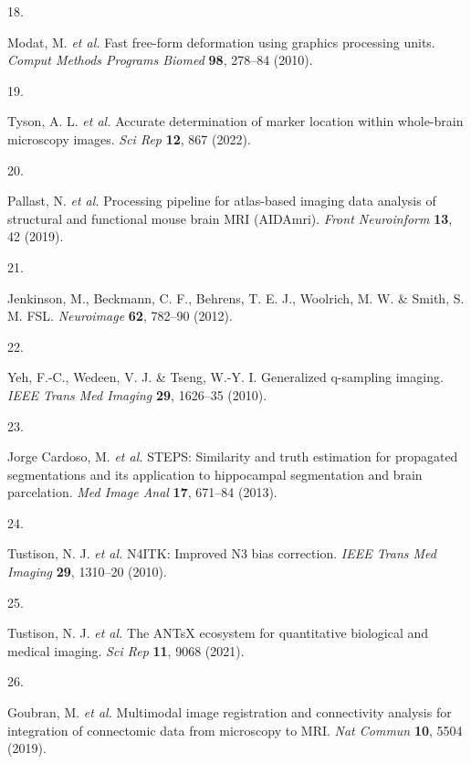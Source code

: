 \documentclass[
  12pt,
]{article}
\newlength{\cslhangindent}
\newlength{\csllabelwidth}
\newenvironment{CSLReferences}[2] %
 {%
  \setlength{\parindent}{0pt}
  \ifodd #1 \everypar{\setlength{\hangindent}{\cslhangindent}}\ignorespaces\fi
  \ifnum #2 > 0
  \setlength{\parskip}{#2\baselineskip}
  \fi
 }%
 {}
\newcommand{\CSLLeftMargin}[1]{\parbox[t]{\csllabelwidth}{#1}}
\newcommand{\CSLRightInline}[1]{\parbox[t]{\linewidth - \csllabelwidth}{#1}\break}
\begin{document}
\begin{CSLReferences}{0}{0}
\leavevmode{}%
\CSLLeftMargin{18. }
\CSLRightInline{Modat, M. \emph{et al.} Fast free-form deformation using
graphics processing units. \emph{Comput Methods Programs Biomed}
\textbf{98}, 278--84 (2010).}

\leavevmode{}%
\CSLLeftMargin{19. }
\CSLRightInline{Tyson, A. L. \emph{et al.} Accurate determination of
marker location within whole-brain microscopy images. \emph{Sci Rep}
\textbf{12}, 867 (2022).}

\leavevmode{}%
\CSLLeftMargin{20. }
\CSLRightInline{Pallast, N. \emph{et al.} Processing pipeline for
atlas-based imaging data analysis of structural and functional mouse
brain MRI (AIDAmri). \emph{Front Neuroinform} \textbf{13}, 42 (2019).}

\leavevmode{}%
\CSLLeftMargin{21. }
\CSLRightInline{Jenkinson, M., Beckmann, C. F., Behrens, T. E. J.,
Woolrich, M. W. \& Smith, S. M. FSL. \emph{Neuroimage} \textbf{62},
782--90 (2012).}

\leavevmode{}%
\CSLLeftMargin{22. }
\CSLRightInline{Yeh, F.-C., Wedeen, V. J. \& Tseng, W.-Y. I. Generalized
q-sampling imaging. \emph{IEEE Trans Med Imaging} \textbf{29}, 1626--35
(2010).}

\leavevmode{}%
\CSLLeftMargin{23. }
\CSLRightInline{Jorge Cardoso, M. \emph{et al.} STEPS: Similarity and
truth estimation for propagated segmentations and its application to
hippocampal segmentation and brain parcelation. \emph{Med Image Anal}
\textbf{17}, 671--84 (2013).}

\leavevmode{}%
\CSLLeftMargin{24. }
\CSLRightInline{Tustison, N. J. \emph{et al.} {N4ITK}: Improved {N3}
bias correction. \emph{IEEE Trans Med Imaging} \textbf{29}, 1310--20
(2010).}

\leavevmode{}%
\CSLLeftMargin{25. }
\CSLRightInline{Tustison, N. J. \emph{et al.} The ANTsX ecosystem for
quantitative biological and medical imaging. \emph{Sci Rep} \textbf{11},
9068 (2021).}

\leavevmode{}%
\CSLLeftMargin{26. }
\CSLRightInline{Goubran, M. \emph{et al.} Multimodal image registration
and connectivity analysis for integration of connectomic data from
microscopy to MRI. \emph{Nat Commun} \textbf{10}, 5504 (2019).}


\end{CSLReferences}
\end{document}
